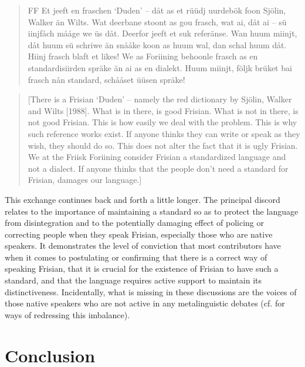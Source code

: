 \documentclass[output=paper]{langsci/langscibook}
\begin{document}
\begin{quote}
FF Et jeeft en fraschen ‘Duden’ – dåt as et rüüdj uurdebök foon Sjölin, Walker än Wilts. Wat deerbane stoont as gou frasch, wat ai, dåt ai – sü iinjfåch mååge we üs dåt. Deerfor jeeft et suk referänse. Wan huum miinjt, dåt huum sü schriwe än snååke koon as huum wal, dan schal huum dåt. Hiinj frasch blaft et likes! We as Foriining behoonle frasch as en standardisiirden spräke än ai as en dialekt. Huum miinjt, följk brüket bai frasch nån standard, schååset üüsen spräke! 
\end{quote}

\begin{quote}
[There is a Frisian ‘Duden’ – namely the red dictionary by Sjölin, Walker and Wilts [1988]. What is in there, is good Frisian. What is not in there, is not good Frisian. This is how easily we deal with the problem. This is why such reference works exist. If anyone thinks they can write or speak as they wish, they should do so. This does not alter the fact that it is ugly Frisian. We at the Friisk Foriining consider Frisian a standardized language and not a dialect. If anyone thinks that the people don’t need a standard for Frisian, damages our language.]
\end{quote}

This exchange continues back and forth a little longer. The principal discord relates to the importance of maintaining a standard so as to protect the language from disintegration and to the potentially damaging effect of policing or correcting people when they speak Frisian, especially those who are native speakers. It demonstrates the level of conviction that most contributors have when it comes to postulating or confirming that there is a correct way of speaking Frisian, that it is crucial for the existence of Frisian to have such a standard, and that the language requires active support to maintain its distinctiveness. Incidentally, what is missing in these discussions are the voices of those native speakers who are not active in any metalinguistic debates (cf. \citealt{AdmiraalEtAL2019} for ways of redressing this imbalance). 

\section{Conclusion}
\label{sec:gregersen:6}
\end{document}
